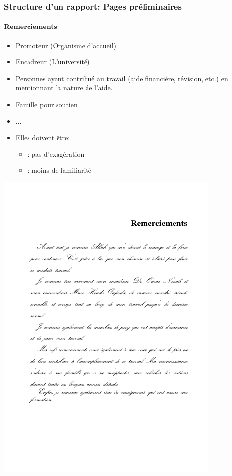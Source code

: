 \documentclass[xcolor=table]{beamer}
\begin{document}
\begin{frame}
\frametitle{Structure d'un rapport: Pages préliminaires}
\framesubtitle{Remerciements}

\begin{minipage}{0.52\textwidth}
	\begin{itemize}
		\item Promoteur (Organisme d'accueil)
		\item Encadreur (L'université)
		\item Personnes ayant contribué au travail (aide financière, révision, etc.) en mentionnant la nature de l'aide.
		\item Famille pour soutien
		\item ...
		\item Elles doivent être:
		\begin{itemize}
			\item {}: pas d'exagération
			\item {}: moins de familiarité
		\end{itemize}
	\end{itemize}
\end{minipage}
\begin{minipage}{0.42\textwidth}
	\includegraphics[width=\textwidth]{..//img/Bweb03-redaction/remerciements.png}
\end{minipage}

\end{frame}
\end{document}
